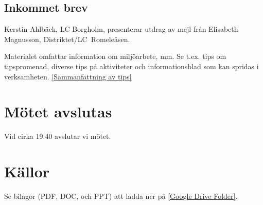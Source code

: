 \documentclass[12pt,a4paper]{article}
\begin{document}
\subsection{Inkommet brev}
Kerstin Ahlbäck, LC Borgholm, presenterar utdrag av mejl från Elisabeth Magnusson, Distriktet/LC~Romeleåsen.

Materialet omfattar information om miljöarbete, mm.
Se t.ex. tips om tipspromenad, diverse tips på aktiviteter och informationsblad som kan spridas i verksamheten.
\href{https://drive.google.com/file/d/1vYT9ujxSpDl-wxA_4NE8HqybtCya5Rnv/view?usp=sharing}{[Sammanfattning av tips]}

\section{Mötet avslutas}
Vid cirka 19.40 avslutar vi mötet.

\section{Källor}
Se bilagor (PDF, DOC, och PPT) att ladda ner på
\href{https://drive.google.com/drive/folders/1NU1iIbVoHtMDIEwPayR9GR10s5UctEki?usp=sharing}{[Google Drive Folder]}.
\end{document}
